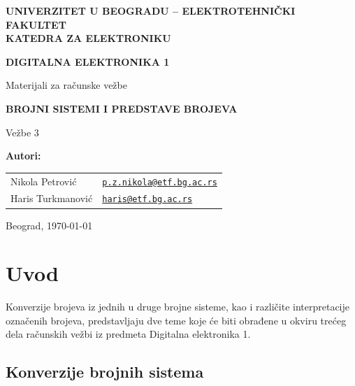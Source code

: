 \documentclass[a4paper,11pt]{article}
\numberwithin{equation}{section}
\begin{document}
\hypersetup{pageanchor=false}
\begin{titlepage}
\thispagestyle{empty}
\begin{center}
{\Large\bfseries UNIVERZITET U BEOGRADU -- ELEKTROTEHNIČKI FAKULTET\\ KATEDRA ZA ELEKTRONIKU\par}
\vspace{25mm}
{\LARGE\bfseries DIGITALNA ELEKTRONIKA 1\par}
\vspace{2mm}
{\large Materijali za računske vežbe\par}
\vspace{18mm}
{\Large\bfseries BROJNI SISTEMI I PREDSTAVE BROJEVA\par}
\vspace{3mm}
{\large Vežbe 3\par}
\vfill
\begin{minipage}{0.62\linewidth}
\raggedright\textbf{Autori:}\\[4pt]\small
\begin{tabular}{@{}ll@{}}
Nikola Petrović & \href{mailto:p.z.nikola@etf.bg.ac.rs}{\texttt{p.z.nikola@etf.bg.ac.rs}}\\
Haris Turkmanović & \href{mailto:haris@etf.bg.ac.rs}{\texttt{haris@etf.bg.ac.rs}}\\
\end{tabular}
\end{minipage}\hfill
\begin{minipage}{0.34\linewidth}\raggedleft Beograd, \today\end{minipage}
\end{center}
\end{titlepage}
\hypersetup{pageanchor=true}
\tableofcontents
\newpage

\FloatBarrier
\section{Uvod}\label{sec:1}


Konverzije brojeva iz jednih u druge brojne sisteme, kao i različite interpretacije označenih brojeva, predstavljaju dve teme koje će biti obrađene u okviru trećeg dela računskih vežbi iz predmeta Digitalna elektronika 1.



\FloatBarrier
\subsection{Konverzije brojnih sistema}\label{sec:1.1}
\end{document}
